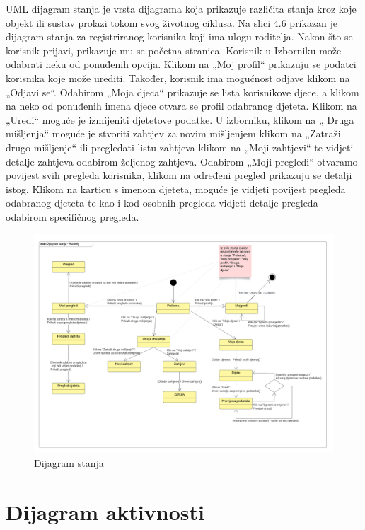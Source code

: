 			UML dijagram stanja je vrsta dijagrama koja prikazuje različita stanja kroz koje objekt ili sustav prolazi tokom svog životnog ciklusa. Na slici 4.6 prikazan je dijagram stanja za registriranog korisnika koji ima ulogu roditelja. Nakon što se korisnik prijavi, prikazuje mu se početna stranica. Korisnik u Izborniku može odabrati neku od ponuđenih opcija. Klikom na „Moj profil“ prikazuju se podatci korisnika koje može urediti. Također, korisnik ima mogućnost odjave klikom na „Odjavi se“. Odabirom „Moja djeca“ prikazuje se lista korisnikove djece, a klikom na neko od ponuđenih imena djece otvara se profil odabranog djeteta. Klikom na „Uredi“ moguće je izmijeniti djetetove podatke. U izborniku, klikom na „ Druga mišljenja“ moguće je stvoriti zahtjev za novim mišljenjem klikom na „Zatraži drugo mišljenje“ ili pregledati listu zahtjeva klikom na „Moji zahtjevi“ te vidjeti detalje zahtjeva odabirom željenog zahtjeva. Odabirom „Moji pregledi“ otvaramo povijest svih pregleda korisnika, klikom na određeni pregled prikazuju se detalji istog. Klikom na karticu s imenom djeteta, moguće je vidjeti povijest pregleda odabranog djeteta te kao i kod osobnih pregleda vidjeti detalje pregleda odabirom specifičnog pregleda.
			
				\begin{figure}[H]
					\includegraphics[width=\textwidth]{slike/DijagramStanja.png} 
					\caption{Dijagram stanja} 
				\end{figure}
				\eject 
		
		\section{Dijagram aktivnosti}
			
